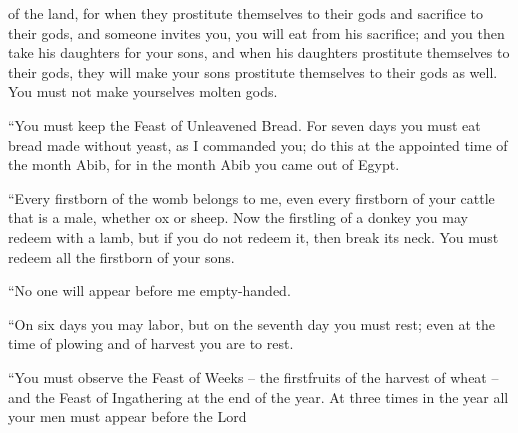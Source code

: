 {of the land,
for when they prostitute
themselves
to their gods
and sacrifice
to their gods,
and someone invites
you, you will eat
from his sacrifice;
and you then take
his daughters
for your sons,
and when his daughters
prostitute
themselves
to their gods,
they
will make your sons
prostitute
themselves
to their gods as well.
You must not
make
yourselves molten
gods.
\par }{\PP {}“You must keep
the Feast
of Unleavened
Bread. For seven
days
you must eat
bread made without yeast,
as
I commanded
you; do this at the appointed
time of the month
Abib,
for
in the month
Abib
you came out
of Egypt.
\par }{\PP {}“Every
firstborn
of the womb
belongs to me, even every
firstborn
of your cattle
that is a male, whether ox
or sheep.
Now the firstling
of a donkey
you may redeem
with a lamb,
but if
you do not
redeem
it, then break
its neck.
You must redeem
all
the firstborn
of your sons.
\par }{\PP “No
one will appear
before
me empty-handed.
\par }{\PP {}“On
six
days
you may labor,
but on the seventh
day
you must rest;
even at the time of plowing
and of harvest
you are to rest.
\par }{\PP {}“You must observe
the Feast
of Weeks
– the firstfruits
of the harvest
of wheat
– and the Feast
of Ingathering
at the end
of the year.
At three
times
in the year
all
your men
must appear before
the Lord

}
